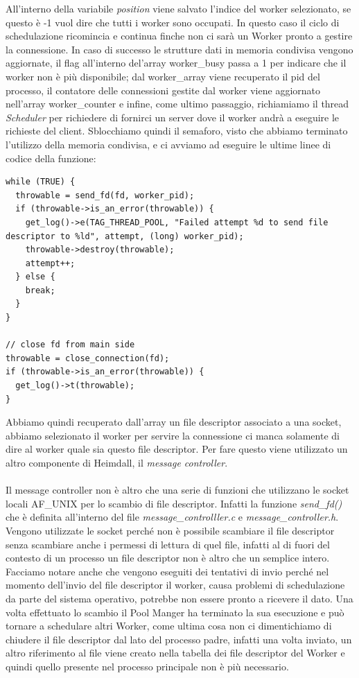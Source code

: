 \documentclass[italian]{tktltiki2}
\begin{document}
All'interno della variabile \emph{position} viene salvato l'indice del worker selezionato, se questo è -1 vuol dire che tutti i worker sono occupati. In questo caso il ciclo di schedulazione ricomincia e continua finche non ci sarà un Worker pronto a gestire la connessione. In caso di successo le strutture dati in memoria condivisa vengono aggiornate, il flag all'interno del'array worker\_busy passa a 1 per indicare che il worker non è più disponibile; dal worker\_array viene recuperato il pid del processo, il contatore delle connessioni gestite dal worker viene aggiornato nell'array worker\_counter e infine, come ultimo passaggio, richiamiamo il thread \emph{Scheduler} per richiedere di fornirci un server dove il worker andrà a eseguire le richieste del client. Sblocchiamo quindi il semaforo, visto che abbiamo terminato l'utilizzo della memoria condivisa, e ci avviamo ad eseguire le ultime linee di codice della funzione:

\begin{lstlisting}
while (TRUE) {
  throwable = send_fd(fd, worker_pid);
  if (throwable->is_an_error(throwable)) {
    get_log()->e(TAG_THREAD_POOL, "Failed attempt %d to send file descriptor to %ld", attempt, (long) worker_pid);
    throwable->destroy(throwable);
    attempt++;
  } else {
    break;
  }
}

// close fd from main side
throwable = close_connection(fd);
if (throwable->is_an_error(throwable)) {
  get_log()->t(throwable);
}
\end{lstlisting}
Abbiamo quindi recuperato dall'array un file descriptor associato a una socket, abbiamo selezionato il worker per servire la connessione ci manca solamente di dire al worker quale sia questo file descriptor. Per fare questo viene utilizzato un altro componente di Heimdall, il \emph{message controller}.\\\\ Il message controller non è altro che una serie di funzioni che utilizzano le socket locali AF\_UNIX per lo scambio di file descriptor. Infatti la funzione \emph{send\_fd()} che è definita all'interno del file \emph{message\_controlller.c} e \emph{message\_controller.h}. Vengono utilizzate le socket perché non è possibile scambiare il file descriptor senza scambiare anche i permessi di lettura di quel file, infatti al di fuori del contesto di un processo un file descriptor non è altro che un semplice intero. Facciamo notare anche che vengono eseguiti dei tentativi di invio perché nel momento dell'invio del file descriptor il worker, causa problemi di schedulazione da parte del sistema operativo, potrebbe non essere pronto a ricevere il dato. Una volta effettuato lo scambio il Pool Manger ha terminato la sua esecuzione e può tornare a schedulare altri Worker, come ultima cosa non ci dimentichiamo di chiudere il file descriptor dal lato del processo padre, infatti una volta inviato, un altro riferimento al file viene creato nella tabella dei file descriptor del Worker e quindi quello presente nel processo principale non è più necessario.
\end{document}
